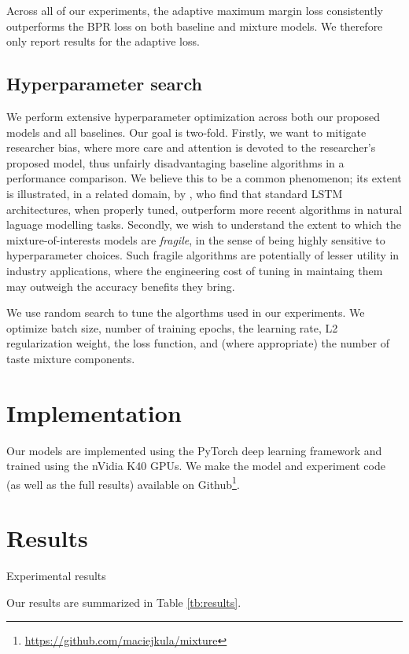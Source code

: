 \documentclass[sigconf]{acmart}
\begin{document}
Across all of our experiments, the adaptive maximum margin loss consistently outperforms the BPR loss on both baseline and mixture models. We therefore only report results for the adaptive loss.

\subsection{Hyperparameter search}

We perform extensive hyperparameter optimization across both our proposed models and all baselines. Our goal is two-fold. Firstly, we want to mitigate researcher bias, where more care and attention is devoted to the researcher's proposed model, thus unfairly disadvantaging baseline algorithms in a performance comparison. We believe this to be a common phenomenon; its extent is illustrated, in a related domain, by \cite{melis2017state}, who find that standard LSTM architectures, when properly tuned, outperform more recent algorithms in natural laguage modelling tasks. Secondly, we wish to understand the extent to which the mixture-of-interests models are \emph{fragile}, in the sense of being highly sensitive to hyperparameter choices. Such fragile algorithms are potentially of lesser utility in industry applications, where the engineering cost of tuning in maintaing them may outweigh the accuracy benefits they bring.

We use random search to tune the algorthms used in our experiments. We optimize batch size, number of training epochs, the learning rate, L2 regularization weight, the loss function, and (where appropriate) the number of taste mixture components.

\section{Implementation}
Our models are implemented using the PyTorch deep learning framework \citep{paszke2017pytorch} and trained using the nVidia K40 GPUs. We make the model and experiment code (as well as the full results) available on Github\footnote{\url{https://github.com/maciejkula/mixture}}.

\section{Results}
\begin{table}[htbp]
\caption{Experimental results}
\label{tb:results}

\end{table}
Our results are summarized in Table \ref{tb:results}.
\end{document}
